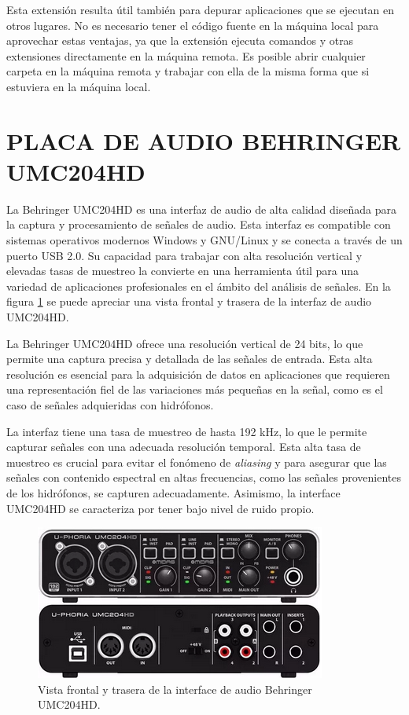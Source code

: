 Esta extensión resulta útil también para depurar aplicaciones que se ejecutan en otros lugares. No es necesario tener el código fuente en la máquina local para aprovechar estas ventajas, ya que la extensión ejecuta comandos y otras extensiones directamente en la máquina remota. Es posible abrir cualquier carpeta en la máquina remota y trabajar con ella de la misma forma que si estuviera en la máquina local.

\clearpage
\section{PLACA DE AUDIO BEHRINGER UMC204HD}

La Behringer UMC204HD es una interfaz de audio de alta calidad diseñada para la captura y procesamiento de señales de audio. Esta interfaz es compatible con sistemas operativos modernos Windows y GNU/Linux y se conecta a través de un puerto USB 2.0. Su capacidad para trabajar con alta resolución vertical y elevadas tasas de muestreo la convierte en una herramienta útil para una variedad de aplicaciones profesionales en el ámbito del análisis de señales. En la figura \ref{fig:placa} se puede apreciar una vista frontal y trasera de la interfaz de audio UMC204HD.

La Behringer UMC204HD ofrece una resolución vertical de 24 bits, lo que permite una captura precisa y detallada de las señales de entrada. Esta alta resolución es esencial para la adquisición de datos en aplicaciones que requieren una representación fiel de las variaciones más pequeñas en la señal, como es el caso de señales adquieridas con hidrófonos.

La interfaz tiene una tasa de muestreo de hasta 192 kHz, lo que le permite capturar señales con una adecuada resolución temporal. Esta alta tasa de muestreo es crucial para evitar el fonómeno de \textit{aliasing} y para asegurar que las señales con contenido espectral en altas frecuencias, como las señales provenientes de los hidrófonos, se capturen adecuadamente.  Asimismo, la interface UMC204HD se caracteriza por tener bajo nivel de ruido propio. 

\vspace{10px}
\begin{figure}[ht]
    \centering
    \includegraphics[width=.5\textwidth]{graficos/behringer.png}
    \caption[]{Vista frontal y trasera de la interface de audio Behringer UMC204HD.}
    \label{fig:placa}
\end{figure}

